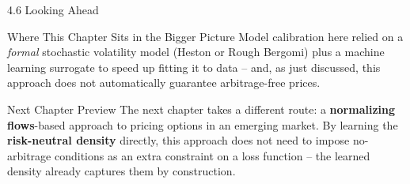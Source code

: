 \documentclass[aspectratio=169,10pt]{beamer}
\begin{document}
\begin{frame}{4.6 Looking Ahead}
  \begin{block}{Where This Chapter Sits in the Bigger Picture}
    Model calibration here relied on a \emph{formal} stochastic
    volatility model (Heston or Rough Bergomi) plus a machine learning
    surrogate to speed up fitting it to data -- and, as just discussed,
    this approach does not automatically guarantee arbitrage-free prices.
  \end{block}
  \begin{alertblock}{Next Chapter Preview}
    The next chapter takes a different route: a \textbf{normalizing
    flows}-based approach to pricing options in an emerging market. By
    learning the \textbf{risk-neutral density} directly, this approach
    does not need to impose no-arbitrage conditions as an extra
    constraint on a loss function -- the learned density already
    captures them by construction.
  \end{alertblock}
\end{frame}
\end{document}
